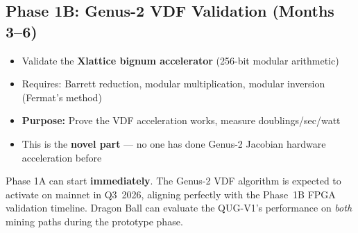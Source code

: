 \documentclass[11pt,a4paper]{article}
\begin{document}
\subsection{Phase 1B: Genus-2 VDF Validation (Months 3--6)}

\begin{itemize}[leftmargin=1.5em]
    \item Validate the \textbf{Xlattice bignum accelerator} (256-bit modular arithmetic)
    \item Requires: Barrett reduction, modular multiplication, modular inversion (Fermat's method)
    \item \textbf{Purpose:} Prove the VDF acceleration works, measure doublings/sec/watt
    \item This is the \textbf{novel part} --- no one has done Genus-2 Jacobian hardware acceleration before
\end{itemize}

\begin{highlight}
Phase 1A can start \textbf{immediately}. The Genus-2 VDF algorithm is expected to activate on mainnet in Q3~2026, aligning perfectly with the Phase~1B FPGA validation timeline. Dragon Ball can evaluate the QUG-V1's performance on \emph{both} mining paths during the prototype phase.
\end{highlight}

\begin{center}
\end{center}
\end{document}
